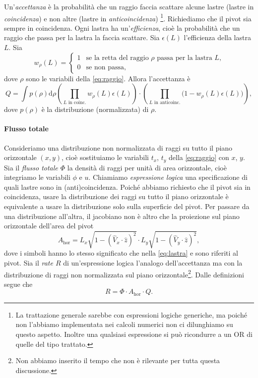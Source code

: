 Un'\emph{accettanza} è la probabilità che un raggio
faccia scattare alcune lastre (lastre in \emph{coincidenza})
e non altre (lastre in \emph{anticoincidenza})%
\footnote{La trattazione generale sarebbe con espressioni logiche generiche,
ma poiché non l'abbiamo implementata nei calcoli numerici non ci dilunghiamo su questo aspetto.
Inoltre una qualsiasi espressione si può ricondurre a un OR di quelle del tipo trattato.}.
Richiediamo che il pivot sia sempre in coincidenza.
Ogni lastra ha un'\emph{efficienza},
cioè la probabilità che un raggio che passa per la lastra la faccia scattare.
Sia $\epsilon(L)$ l'efficienza della lastra $L$.
Sia
\begin{equation*}
	w_\rho(L) = \begin{cases}
		1 & \text{se la retta del raggio $\rho$ passa per la lastra $L$,} \\
		0 & \text{se non passa,}
	\end{cases}
\end{equation*}
dove $\rho$ sono le variabili della \eqref{eq:raggio}.
Allora l'accettanza è
\begin{equation}
	\label{eq:acc}
	Q = \int p(\rho) \mathrm{d} \rho
	\left( \prod_\text{$L$ in coinc.} w_\rho(L) \epsilon(L) \right)
	\cdot \left( \prod_\text{$L$ in anticoinc.} \big(1 - w_\rho(L) \epsilon(L)\big) \right),
\end{equation}
dove $p(\rho)$ è la distribuzione (normalizzata) di $\rho$.

\paragraph{Flusso totale}

Consideriamo una distribuzione non normalizzata di raggi su tutto il piano orizzontale $(x,y)$,
cioè sostituiamo le variabili $t_x$, $t_y$ della \eqref{eq:raggio} con $x$, $y$.
Sia il \emph{flusso totale $\Phi$} la densità di raggi per unità di area orizzontale,
cioè integriamo le variabili $\phi$ e $u$.
Chiamiamo \emph{espressione logica} una specificazione di quali lastre sono in (anti)coincidenza.
Poiché abbiamo richiesto che il pivot sia in coincidenza,
usare la distribuzione dei raggi su tutto il piano orizzontale è equivalente
a usare la distribuzione solo sulla superficie del pivot.
Per passare da una distribuzione all'altra,
il jacobiano non è altro che la proiezione sul piano orizzontale dell'area del pivot
\begin{equation*}
	A_\text{hor} = L_x \sqrt{1-(\hat V_x\cdot\hat z)^2} \cdot L_y \sqrt{1-(\hat V_y\cdot\hat z)^2},
\end{equation*}
dove i simboli hanno lo stesso significato che nella \eqref{eq:lastra}
e sono riferiti al pivot.
Sia il \emph{rate $R$} di un'espressione logica l'analogo dell'accettanza
ma con la distribuzione di raggi non normalizzata sul piano orizzontale\footnote{Non abbiamo inserito il tempo che non è rilevante per tutta questa discussione.}.
Dalle definizioni segue che
\begin{equation}
	\label{eq:rate}
	R = \Phi \cdot A_\text{hor} \cdot Q.
\end{equation}

